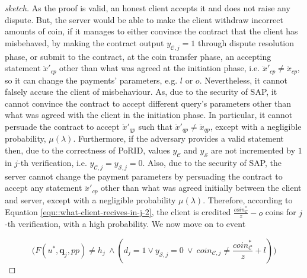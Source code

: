 \begin{proof}[sketch]
    
As the  proof is valid, an honest client accepts it and does not raise any dispute. But, the server  would be able to make the client  withdraw incorrect amounts of coin, if it manages to either convince the contract that the client has misbehaved, by making the contract output  $y_{\scriptscriptstyle\mathcal {C},j}=1$ through dispute resolution phase, or submit to the contract, at the coin transfer phase,  an accepting  statement $\ddot{x}'_{\scriptscriptstyle cp}$ other than what was agreed at the initiation phase, i.e. $\ddot{x}'_{\scriptscriptstyle cp}\neq\ddot{x}_{\scriptscriptstyle cp}$, so it can change the payments' parameters, e.g. $l$ or $o$. Nevertheless, it cannot falsely accuse the client of misbehaviour. As,  due to the security of SAP, it cannot  convince the contract to accept different query's parameters other than what was agreed with the client in the initiation phase. In particular, it cannot persuade the contract to accept  $\ddot{x}'_{\scriptscriptstyle qp}$ such that $\ddot{x}'_{\scriptscriptstyle qp}\neq \ddot{x}_{\scriptscriptstyle qp}$, except with a negligible probability, $\mu(\lambda)$.  Furthermore, if the adversary provides a valid statement then, due to the correctness of PoRID, values  $y_{\scriptscriptstyle\mathcal {C}}$ and $y_{\scriptscriptstyle\mathcal {S}}$ are not incremented by $1$  in $j$-th verification, i.e. $y_{\scriptscriptstyle\mathcal{C},j}=y_{\scriptscriptstyle\mathcal{S},j}=0$. Also,  due to the security of SAP, the server cannot change the payment parameters by persuading the contract to accept any statement $\ddot{x}'_{\scriptscriptstyle cp}$ other than what was agreed initially between the client and server, except with a negligible probability $\mu(\lambda)$.  Therefore, according to Equation \ref{equ::what-client-recives-in-j-2}, the client is credited $\frac{coin_{\scriptscriptstyle\mathcal C}^{\scriptscriptstyle*}}{z}-o$ coins for $j$-th verification, with a high probability.  We now move on to event 
     
    
    
  $$  \Big(F(u^{\scriptscriptstyle *},\bm{q}_{\scriptscriptstyle j}, {pp})\neq h_{\scriptscriptstyle j} \ \wedge (d_{\scriptscriptstyle j}=1	\vee y_{\scriptscriptstyle \mathcal{S},j}=0 \ \vee \  {coin_{\scriptscriptstyle\mathcal{C},j}\neq \frac{coin_{\scriptscriptstyle\mathcal C}^{\scriptscriptstyle*}}{z}+l} ) \Big)$$
    
    
    

\end{proof}

